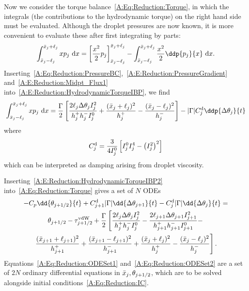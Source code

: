\begin{subappendices}
Now we consider the torque balance~\eqref{A:Eq:Reduction:Torque}, in which the integrals (the contributions to the hydrodynamic torque) on the right hand side must be evaluated.  Although the droplet pressures are now known, it is more convenient to evaluate these after first integrating by parts:
\begin{equation}\label{A:E:Reduction:HydrodynamicTorqueIBP}
\int^{\xbarj + \ellj}_{\xbarj - \ellj} x p_j~\mathrm{d}x=  \left[\frac{x^2}{2}p_{j}\right]_{\xbar_{j} - \ell_{j}}^{\xbar_{j}+\ell_j} -\int^{\bar{x}_{j}+ \ell_{j}}_{\bar{x}_{j}- \ell_{j}} \frac{x^2}{2} \ddp{p_{j}}{x}~\mathrm{d}x.
\end{equation}
Inserting~\eqref{A:Eq:Reduction:PressureBC},~\eqref{A:E:Reduction:PressureGradient}  and~\eqref{A:E:Reduction:Midpt_Flux1} into~\eqref{A:E:Reduction:HydrodynamicTorqueIBP}, we find
\begin{equation}\label{A:E:Reduction:HydrodynamicTorqueIBP2}
\int^{\xbarj + \ellj}_{\xbarj - \ellj} x p_j~\mathrm{d}x  = \frac{\Gamma}{2}\left[  \frac{2\ell_{j}\Delta \theta_{j}I^2_j}{ h_j^+ h_j^- I^0_j}           +   \frac{(\bar{x}_{j}+\ell_{j})^2}{h_{j}^+} - \frac{(\bar{x}_{j}-\ell_{j})^2}{h_{j}^-}          \right] - |\Gamma|\viscdamp_j\ddp{\Delta \theta_{j}}{t}
\end{equation}
where
\begin{equation}\label{A:Eq:Reduction:ViscDampDefn}
C^{\text{d}}_j = \frac{3}{4I^0_j}\left[I^0_j I^4_j - \left(I^2_j\right)^2\right]
\end{equation}
which can be interpreted as damping arising from droplet viscosity.

Inserting~\eqref{A:E:Reduction:HydrodynamicTorqueIBP2} into~\eqref{A:Eq:Reduction:Torque} gives a set of $N$ ODEs
\begin{multline}
-C_p\dd{\theta_{j+1/2}}{t} + \viscdamp_{j+1}|\Gamma|\dd{\Delta \theta_{j+1}}{t} -  \viscdamp_{j}|\Gamma|\dd{\Delta \theta_{j}}{t} =\\
\theta_{j+1/2} - \tau^{\text{vdW}}_{j+1/2} + \frac{\Gamma}{2}\left[\frac{2\ell_{j}\Delta \theta_{j}I^2_j}{ h_j^+ h_j^-I^0_j} - \frac{2\ell_{j+1}\Delta \theta_{j+1}I^2_{j+1}}{ h_{j+1}^+ h_{j+1}^-I^0_{j+1}} -\right. \\
\left.\frac{(\bar{x}_{j+1}+\ell_{j+1})^2}{h_{j+1}^+} + \frac{(\bar{x}_{j+1}-\ell_{j+1})^2}{h_{j+1}^-} + \frac{(\bar{x}_{j}+\ell_{j})^2}{h_{j}^+} - \frac{(\bar{x}_{j}-\ell_{j})^2}{h_{j}^-}\right].\label{A:Eq:Reduction:ODESet2}
\end{multline}
Equations~\eqref{A:Eq:Reduction:ODESet1} and~\eqref{A:Eq:Reduction:ODESet2}
are a set of $2N$ ordinary differential equations in $\bar{x}_j, \theta_{j+1/2}$, which are to be solved alongside initial conditions~\eqref{A:Eq:Reduction:IC}.


\end{subappendices}
